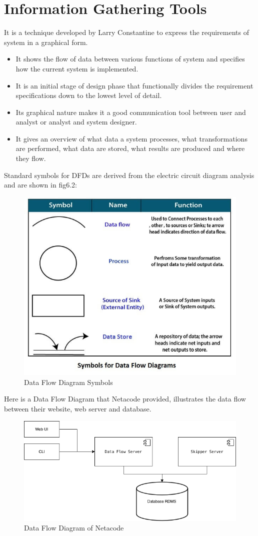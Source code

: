 \documentclass[a4paper,12pt]{report}
\begin{document}
\section{Information Gathering Tools}
It is a technique developed by Larry Constantine to express the requirements of system in a graphical form.
\begin{itemize}
	\item 	It shows the flow of data between various functions of system and specifies how the current system is implemented.
	\item 	It is an initial stage of design phase that functionally divides the requirement specifications down to the lowest level of detail.
	\item 	Its graphical nature makes it a good communication tool between user and analyst or analyst and system designer.
	\item 	It gives an overview of what data a system processes, what transformations are performed, what data are stored, what results are produced and where they flow.
	
\end{itemize}
Standard symbols for DFDs are derived from the electric circuit diagram analysis and are shown in fig6.2:
\begin{figure}[h]
	\centering
	\includegraphics[width=0.7\linewidth]{6_fig2}
	\caption{Data Flow Diagram Symbols}
	\label{fig:6fig2}
\end{figure}
\newpage
Here is a Data Flow Diagram that Netacode provided, illustrates the data flow between their website, web server and database.

\begin{figure}[h]
	\centering
	\includegraphics[width=0.7\linewidth]{6_fig3}
	\caption{Data Flow Diagram of Netacode}
	\label{fig:6fig3}
\end{figure}
\end{document}
